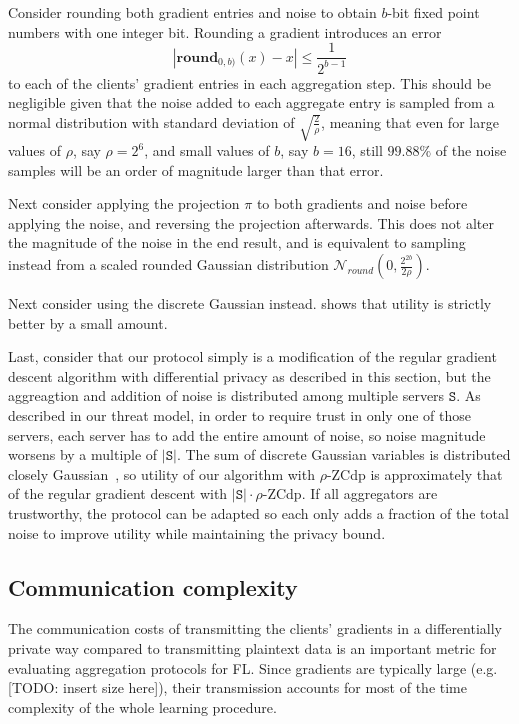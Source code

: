 \documentclass{article}
\begin{document}
Consider rounding both gradient entries and noise to obtain $b$-bit fixed point numbers with one integer bit. Rounding a gradient introduces an error
$$|\textbf{round}_{0,b)}(x) - x|\leq\frac{1}{2^{b-1}}$$
to each of the clients' gradient entries in each aggregation step. This should be negligible given that the noise added to each aggregate entry is sampled from a normal distribution with standard deviation of $\sqrt{\frac{2}{\rho}}$, meaning that even for large values of $\rho$, say $\rho = 2^6$, and small values of $b$, say $b=16$, still $99.88\%$ of the noise samples will be an order of magnitude larger than that error.

Next consider applying the projection $\pi$ to both gradients and noise before applying the noise, and reversing the projection afterwards. This does not alter the magnitude of the noise in the end result, and is equivalent to sampling instead from a scaled rounded Gaussian distribution $\mathcal N_{round}\left(0,\frac{2^{2b}}{2\rho}\right)$.

Next consider using the discrete Gaussian instead. \cite[Corollary 17]{DBLP:journals/corr/abs-2004-00010} shows that utility is strictly better by a small amount.

Last, consider that our protocol simply is a modification of the regular gradient descent algorithm with differential privacy as described in this section, but the aggreagtion and addition of noise is distributed among multiple servers $\texttt{S}$. As described in our threat model, in order to require trust in only one of those servers, each server has to add the entire amount of noise, so noise magnitude worsens by a multiple of $|\texttt{S}|$. The sum of discrete Gaussian variables is distributed closely Gaussian~\cite[Theorem 11]{Kairouz2021TheDD}, so utility of our algorithm with $\rho$-ZCdp is approximately that of the regular gradient descent with $|\texttt{S}|\cdot\rho$-ZCdp. If all aggregators are trustworthy, the protocol can be adapted so each only adds a fraction of the total noise to improve utility while maintaining the privacy bound.


\subsection{Communication complexity}
The communication costs of transmitting the clients' gradients in a
differentially private way compared to transmitting plaintext data is an
important metric for evaluating aggregation protocols for FL. Since gradients
are typically large (e.g. [TODO: insert size here]), their transmission accounts
for most of the time complexity of the whole learning procedure.
\end{document}
